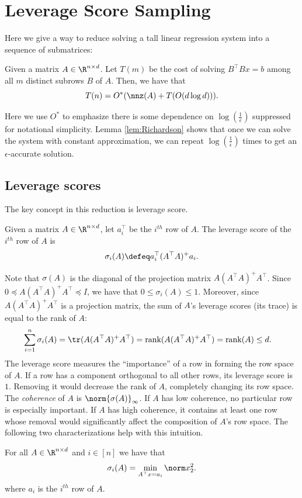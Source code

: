 
\section{Leverage Score Sampling\label{sec:Leverage-Score-Sampling}}

Here we give a way to reduce solving a tall linear regression system
into a sequence of submatrices:
\begin{thm}
Given a matrix $A\in\R^{n\times d}$. Let $T(m)$ be the cost of
solving $B^{\top}Bx=b$ among all $m$ distinct subrows $B$ of $A$.
Then, we have that
\[
T(n)=O^{*}(\nnz(A)+T(O(d\log d))).
\]
\end{thm}

\begin{rem*}
Here we use $O^{*}$ to emphasize there is some dependence on $\log(\frac{1}{\epsilon})$
suppressed for notational simplicity. Lemma \ref{lem:Richardson}
shows that once we can solve the system with constant approximation,
we can repeat $\log(\frac{1}{\epsilon})$ times to get an $\epsilon$-accurate
solution.
\end{rem*}

\subsection{Leverage scores}

The key concept in this reduction is leverage score.
\begin{defn}
Given a matrix $A\in\R^{n\times d}$, let $a_{i}^{\top}$ be the $i^{th}$
row of $A$. The leverage score of the $i^{th}$ row of $A$ is
\[
\sigma_{i}(A)\defeq a_{i}^{\top}(A^{\top}A)^{+}a_{i}.
\]
\end{defn}

Note that $\sigma(A)$ is the diagonal of the projection matrix $A(A^{\top}A)^{+}A^{\top}$.
Since $0\preceq A(A^{\top}A)^{+}A^{\top}\preceq I$, we have that
$0\leq\sigma_{i}(A)\leq1$. Moreover, since $A(A^{\top}A)^{+}A^{\top}$
is a projection matrix, the sum of $A$'s leverage scores (its trace)
is equal to the rank of $A$: 
\begin{align}
\sum_{i=1}^{n}\sigma_{i}(A)=\tr(A(A^{\top}A)^{+}A^{\top}) & =\text{rank}(A(A^{\top}A)^{+}A^{\top})=\text{rank}(A)\le d.\label{rank_bound}
\end{align}
The leverage score measures the ``importance'' of a row in forming
the row space of $A$. If a row has a component orthogonal to all
other rows, its leverage score is $1$. Removing it would decrease
the rank of $A$, completely changing its row space. The \emph{coherence}
of $A$ is $\norm{\sigma(A)}_{\infty}$. If $A$ has low coherence,
no particular row is especially important. If $A$ has high coherence,
it contains at least one row whose removal would significantly affect
the composition of $A$'s row space. The following two characterizations
help with this intuition. 
\begin{lem}
\label{leverage_score_opt} For all $A\in\R^{n\times d}$ and $i\in[n]$
we have that
\[
\sigma_{i}(A)=\min_{A^{\top}x=a_{i}}\norm x_{2}^{2}.
\]
where $a_{i}$ is the $i^{th}$ row of $A$. 
\end{lem}

